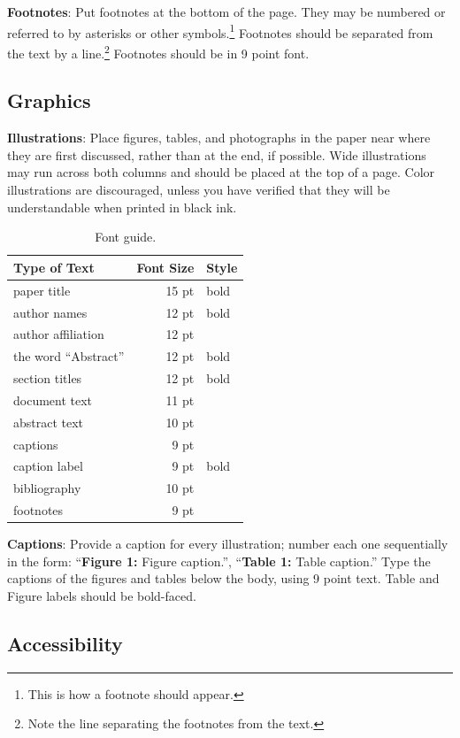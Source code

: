 \documentclass[11pt,letterpaper]{article}
\begin{document}
{\bf Footnotes}: Put footnotes at the bottom of the page. They may
be numbered or referred to by asterisks or other
symbols.\footnote{This is how a footnote should appear.} Footnotes
should be separated from the text by a line.\footnote{Note the
line separating the footnotes from the text.}  Footnotes should be in 9 point font.

\subsection{Graphics}

{\bf Illustrations}: Place figures, tables, and photographs in the
paper near where they are first discussed, rather than at the end, if
possible.  Wide illustrations may run across both columns and should be placed at
the top of a page. Color illustrations are discouraged, unless you have verified that 
they will be understandable when printed in black ink. 

\begin{table}
\small
\centering
\begin{tabular}{|l|rl|}
\hline \bf Type of Text & \bf Font Size & \bf Style \\ \hline
paper title & 15 pt & bold \\
author names & 12 pt & bold \\
author affiliation & 12 pt & \\
the word ``Abstract'' & 12 pt & bold \\
section titles & 12 pt & bold \\
document text & 11 pt  &\\
abstract text & 10 pt & \\
captions & 9 pt & \\
caption label & 9 pt & bold \\
bibliography & 10 pt & \\
footnotes & 9 pt & \\
\hline
\end{tabular}
\caption{\label{font-table} Font guide.}
\end{table}

{\bf Captions}: Provide a caption for every illustration; number each one
sequentially in the form:  ``{\bf Figure 1:} Figure caption.'', ``{\bf Table 1:} Table caption.''  Type the captions of the figures and 
tables below the body, using 9 point text.  Table and Figure labels should be bold-faced.

\subsection{Accessibility}
\label{ssec:accessibility}
\end{document}
